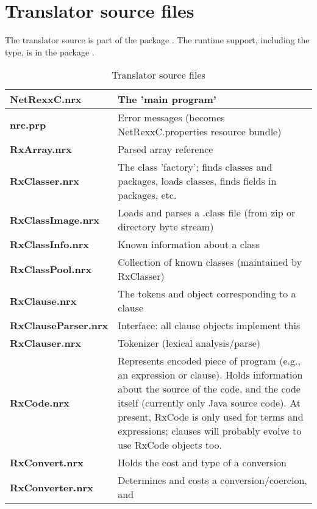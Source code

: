\section{Translator source files}
The translator source is part of the package
. The runtime support, including the
 type, is in the package . 
\begin{table}\caption{Translator source files}
\begin{tabularx}{\textwidth}{>{\bfseries}lX}
\toprule
  NetRexxC.nrx        & The 'main program'
\\\midrule
  nrc.prp             & Error messages (becomes NetRexxC.properties
                         resource bundle)
\\\midrule
  RxArray.nrx         & Parsed array reference
\\\midrule
  RxClasser.nrx       & The class 'factory'; finds classes and
                         packages, loads classes, finds fields in
                         packages, etc.
\\\midrule
  RxClassImage.nrx    & Loads and parses a .class file (from zip or
                         directory byte stream)
\\\midrule
  RxClassInfo.nrx     & Known information about a class
\\\midrule
  RxClassPool.nrx     & Collection of known classes (maintained by
                         RxClasser)
\\\midrule
  RxClause.nrx        & The tokens and object corresponding to a
  clause
\\\midrule
  RxClauseParser.nrx  & Interface: all clause objects implement this
\\\midrule
  RxClauser.nrx       & Tokenizer (lexical analysis/parse)
\\\midrule
  RxCode.nrx          & Represents encoded piece of program (e.g., an
                         expression or clause).  Holds information about
                         the source of the code, and the code itself
                         (currently only Java source code).
                         At present, RxCode is only used for terms and
                         expressions; clauses will probably evolve to
                         use RxCode objects too.
\\\midrule
  RxConvert.nrx       & Holds the cost and type of a conversion
\\\midrule
  RxConverter.nrx     & Determines and costs a conversion/coercion, and

\end{tabularx}
\end{table}
